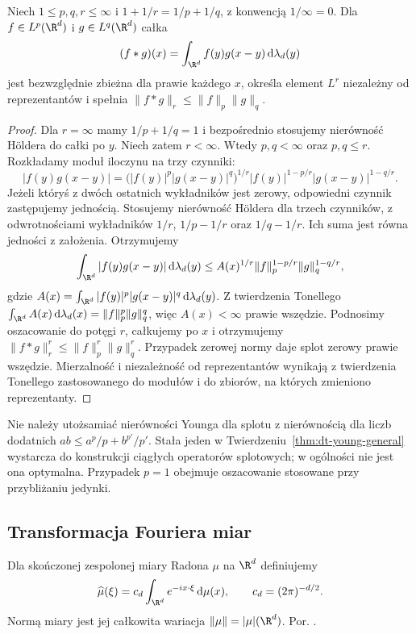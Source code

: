 \begin{twierdzenie}
\label{thm:dt-young-general}
Niech $1\le p,q,r\le\infty$ i
$1+1/r=1/p+1/q$, z konwencją $1/\infty=0$.
Dla $f\in L^p(\R^d)$ i $g\in L^q(\R^d)$ całka
\[
 (f*g)(x)=\int_{\R^d}f(y)g(x-y)\,\mathrm d\lambda_d(y)
\]
jest bezwzględnie zbieżna dla prawie każdego $x$,
określa element $L^r$ niezależny od reprezentantów
i spełnia $\|f*g\|_r\le\|f\|_p\|g\|_q$.
\end{twierdzenie}
\begin{proof}
Dla $r=\infty$ mamy $1/p+1/q=1$ i bezpośrednio
stosujemy nierówność Höldera do całki po $y$.
Niech zatem $r<\infty$. Wtedy $p,q<\infty$ oraz
$p,q\le r$. Rozkładamy moduł iloczynu na trzy czynniki:
\[
 |f(y)g(x-y)|
 =\bigl(|f(y)|^p|g(x-y)|^q\bigr)^{1/r}
 |f(y)|^{1-p/r}|g(x-y)|^{1-q/r}.
\]
Jeżeli któryś z dwóch ostatnich wykładników jest zerowy,
odpowiedni czynnik zastępujemy jednością.
Stosujemy nierówność Höldera dla trzech czynników,
z odwrotnościami wykładników
$1/r$, $1/p-1/r$ oraz $1/q-1/r$.
Ich suma jest równa jedności z założenia.
Otrzymujemy
\[
 \int_{\R^d}|f(y)g(x-y)|\,\mathrm d\lambda_d(y)
 \le A(x)^{1/r}\|f\|_p^{1-p/r}\|g\|_q^{1-q/r},
\]
gdzie
$A(x)=\int_{\R^d}|f(y)|^p|g(x-y)|^q\,\mathrm d\lambda_d(y)$.
Z twierdzenia Tonellego
$\int_{\R^d} A(x)\,\mathrm d\lambda_d(x)=\|f\|_p^p\|g\|_q^q$,
więc $A(x)<\infty$ prawie wszędzie.
Podnosimy oszacowanie do potęgi $r$, całkujemy po $x$
i otrzymujemy $\|f*g\|_r^r\le\|f\|_p^r\|g\|_q^r$.
Przypadek zerowej normy daje splot zerowy prawie wszędzie.
Mierzalność i niezależność od reprezentantów wynikają
z twierdzenia Tonellego zastosowanego do modułów i
do zbiorów, na których zmieniono reprezentanty.
\end{proof}

\begin{uwaga}
\label{rem:dt-young-scope}
Nie należy utożsamiać nierówności Younga dla splotu
z nierównością dla liczb dodatnich
$ab\le a^p/p+b^{p'}/p'$.
Stała jeden w Twierdzeniu~\ref{thm:dt-young-general}
wystarcza do konstrukcji ciągłych operatorów splotowych;
w ogólności nie jest ona optymalna. Przypadek $p=1$
obejmuje oszacowanie stosowane przy przybliżaniu jedynki.
\end{uwaga}

\subsection{Transformacja Fouriera miar}

\begin{definicja}
\label{def:dt-fourier-measure}
Dla skończonej zespolonej miary Radona $\mu$ na $\R^d$
definiujemy
\[
 \widehat\mu(\xi)=c_d\int_{\R^d}e^{-ix\cdot\xi}
 \,\mathrm d\mu(x),\qquad c_d=(2\pi)^{-d/2}.
\]
Normą miary jest jej całkowita wariacja
$\|\mu\|=|\mu|(\R^d)$.
Por. .
\end{definicja}

